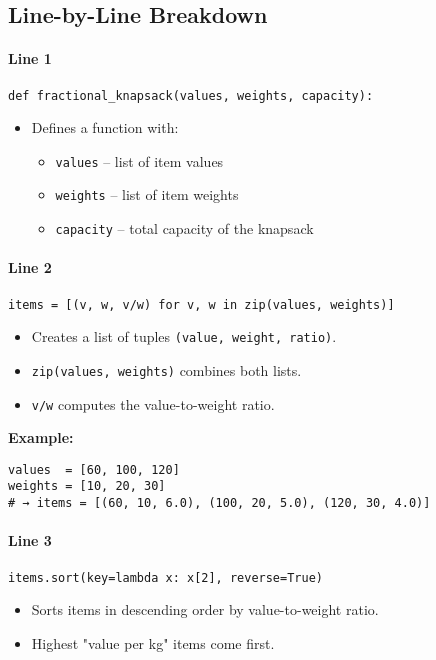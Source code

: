 \documentclass[14pt]{extarticle}
\begin{document}
\subsection{Line-by-Line Breakdown}

\paragraph{Line 1}
\begin{verbatim}
def fractional_knapsack(values, weights, capacity):
\end{verbatim}
\begin{itemize}
    \item Defines a function with:
    \begin{itemize}
        \item \texttt{values} – list of item values
        \item \texttt{weights} – list of item weights
        \item \texttt{capacity} – total capacity of the knapsack
    \end{itemize}
\end{itemize}

\paragraph{Line 2}
\begin{verbatim}
items = [(v, w, v/w) for v, w in zip(values, weights)]
\end{verbatim}
\begin{itemize}
    \item Creates a list of tuples \texttt{(value, weight, ratio)}.
    \item \texttt{zip(values, weights)} combines both lists.
    \item \texttt{v/w} computes the value-to-weight ratio.
\end{itemize}

\textbf{Example:}
\begin{verbatim}
values  = [60, 100, 120]
weights = [10, 20, 30]
# → items = [(60, 10, 6.0), (100, 20, 5.0), (120, 30, 4.0)]
\end{verbatim}

\paragraph{Line 3}
\begin{verbatim}
items.sort(key=lambda x: x[2], reverse=True)
\end{verbatim}
\begin{itemize}
    \item Sorts items in descending order by value-to-weight ratio.
    \item Highest "value per kg" items come first.
\end{itemize}
\end{document}
